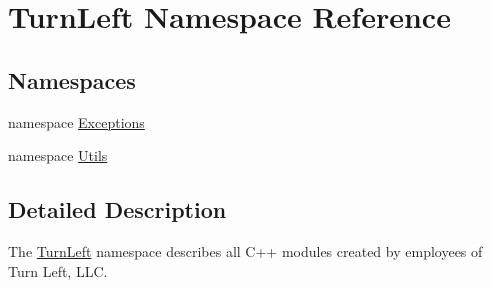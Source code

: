 \hypertarget{namespaceTurnLeft}{
\section{TurnLeft Namespace Reference}
\label{namespaceTurnLeft}
}
\subsection*{Namespaces}
\begin{DoxyCompactItemize}
\item 
namespace \hyperlink{namespaceTurnLeft_1_1Exceptions}{Exceptions}
\item 
namespace \hyperlink{namespaceTurnLeft_1_1Utils}{Utils}
\end{DoxyCompactItemize}


\subsection{Detailed Description}
The \hyperlink{namespaceTurnLeft}{TurnLeft} namespace describes all C++ modules created by employees of Turn Left, LLC. 